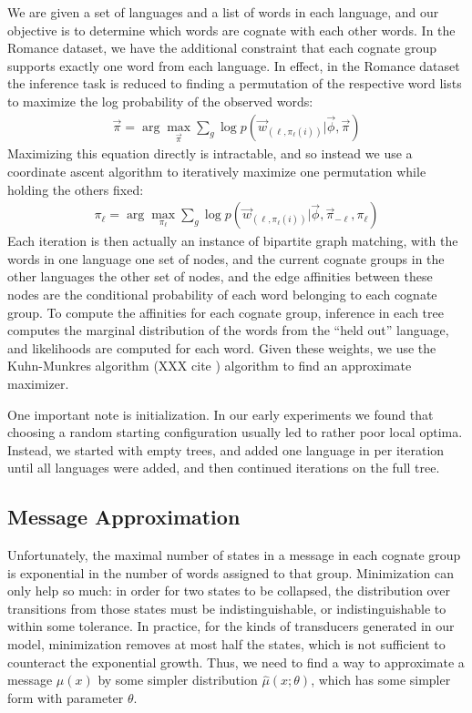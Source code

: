 \documentclass[11pt,a4paper]{article}
\begin{document}
We are given a set of languages and a list of words
in each language, and our objective is to determine which words are
cognate with each other words. In the Romance dataset, we have the
additional constraint that each cognate group supports exactly one
word from each language. In effect, in the Romance dataset the 
inference task is reduced to finding a permutation of the respective
word lists to maximize the log probability of the observed words:
\begin{equation}
  \begin{split}
    \vec{\pi} = \arg\!\max_{\vec \pi} \sum_{g} \log p(\vec w_{(\ell,\pi_\ell(i))}|\vec \phi,\vec \pi)
   \end{split}
 \end{equation}
Maximizing this equation directly is intractable, and so instead
we use a coordinate ascent algorithm to iteratively maximize one
permutation while holding the others fixed:
\begin{equation}
  \begin{split}
    \pi_\ell = \arg\!\max_{\pi_\ell} \sum_{g} \log p(\vec w_{(\ell,\pi_\ell(i))}|\vec \phi,\vec \pi_{-\ell},\pi_\ell)
  \end{split}
\end{equation}
Each iteration is then actually an instance of bipartite graph
matching, with the words in one language one set of nodes, and the
current cognate groups in the other languages the other set of
nodes, and the edge affinities between these nodes are the conditional
probability of each word belonging to each cognate group. To compute
the affinities for each cognate group, inference in each tree
computes the marginal distribution of the words from the ``held
out'' language, and likelihoods are computed for each word.  Given
these weights, we use the Kuhn-Munkres algorithm (XXX cite ) algorithm
to find an approximate maximizer.

One important note is initialization. In our early experiments we
found that choosing a random starting configuration usually led to
rather poor local optima. Instead, we started with empty trees, and
added one language in per iteration until all languages were added,
and then continued iterations on the full tree.

\subsection{Message Approximation}

Unfortunately, the maximal number of states in a message in each
cognate group is exponential in the number of words assigned to
that group. Minimization can only help so much: in order for two
states to be collapsed, the distribution over transitions from those
states must be indistinguishable, or indistinguishable to within
some tolerance. In practice, for the kinds of transducers generated
in our model, minimization removes at most half the states, which
is not sufficient to counteract the exponential growth. Thus, we
need to find a way to approximate a message $\mu(x)$ by some simpler
distribution $\hat\mu(x;\theta)$, which has some simpler form with
parameter $\theta$.
\end{document}
